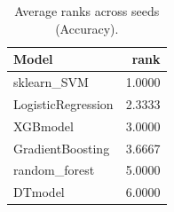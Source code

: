 \begin{table}[t]
\centering
\begin{tabular}{lr}
\toprule
Model & rank \\
\midrule
sklearn_SVM & 1.0000 \\
LogisticRegression & 2.3333 \\
XGBmodel & 3.0000 \\
GradientBoosting & 3.6667 \\
random_forest & 5.0000 \\
DTmodel & 6.0000 \\
\bottomrule
\end{tabular}
\caption{Average ranks across seeds (Accuracy).}
\label{tab:avg_rank_Accuracy}
\end{table}